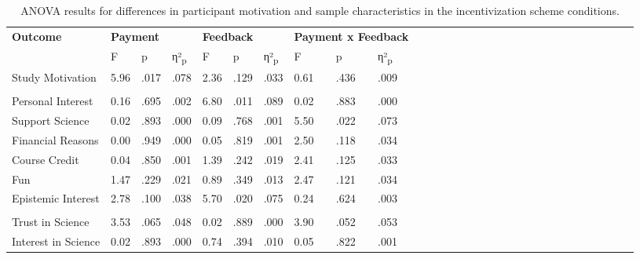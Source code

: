 \documentclass[authordate, empirical]{jote-new-article}
\begin{document}
	\pagebreak

	\begin{table}[t]
		\begin{fullwidth}
		
		
		\caption{ANOVA results for differences in participant motivation and sample characteristics in the incentivization scheme conditions.}
		\centering
		\begin{tabular}{@{} l l l l l l l l l l l l l l l l l l l l l l l l l l l l l l @{}}
			\hline \textbf{Outcome} & \multicolumn{3}{l}{\textbf{Payment}} & \multicolumn{3}{l}{\textbf{Feedback}}
			& \multicolumn{3}{l}{\textbf{Payment x Feedback}} \\

			  & F & p & η²\textsubscript{p} & F & p & η²\textsubscript{p} & F & p & η²\textsubscript{p}
			\\

			\hline Study Motivation & 5.96 & .017 & .078 & 2.36 & .129 & .033 & 0.61 &
			.436 & .009 \\

			  &  &  &  &  &  &  &  &  &  \\

			 Personal Interest & 0.16 & .695 & .002 & 6.80 & .011 & .089 & 0.02 & .883
			& .000 \\

			 Support Science & 0.02 & .893 & .000 & 0.09 & .768 & .001 & 5.50 & .022 &
			.073 \\

			 Financial Reasons & 0.00 & .949 & .000 & 0.05 & .819 & .001 & 2.50 & .118
			& .034 \\

			 Course Credit & 0.04 & .850 & .001 & 1.39 & .242 & .019 & 2.41 & .125 & .033
			\\

			 Fun & 1.47 & .229 & .021 & 0.89 & .349 & .013 & 2.47 & .121 & .034 \\

			 Epistemic Interest & 2.78 & .100 & .038 & 5.70 & .020 & .075 & 0.24 & .624
			& .003 \\

			  &  &  &  &  &  &  &  &  &  \\

			 Trust in Science & 3.53 & .065 & .048 & 0.02 & .889 & .000 & 3.90 & .052 &
			.053 \\

			 Interest in Science & 0.02 & .893 & .000 & 0.74 & .394 & .010 & 0.05 & .822
			& .001 \\


\end{tabular}
\end{fullwidth}
\end{table}
\end{document}
